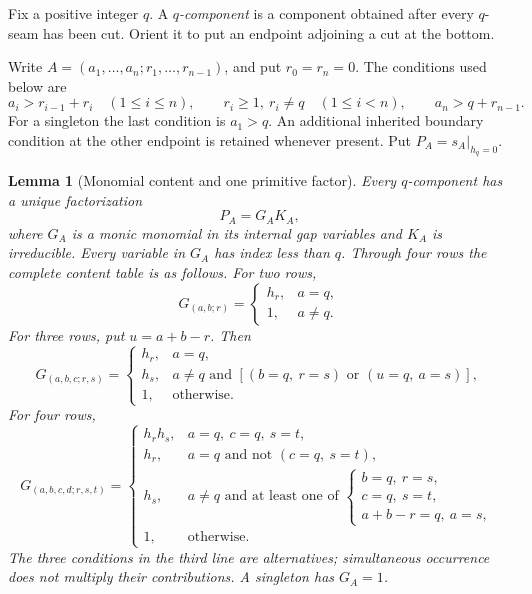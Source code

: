 \documentclass[11pt,a4paper]{amsart}
\numberwithin{equation}{section}
\theoremstyle{plain}
\newtheorem{lemma}[theorem]{Lemma}
\theoremstyle{definition}
\begin{document}
Fix a positive integer \(q\).  A \emph{\(q\)-component} is a
component obtained after every \(q\)-seam has been cut.  Orient it to
put an endpoint adjoining a cut at the bottom.

Write \(A=(a_1,\ldots,a_n;r_1,\ldots,r_{n-1})\), and put
\(r_0=r_n=0\).  The conditions used below are
\[
 a_i>r_{i-1}+r_i\quad(1\le i\le n),\qquad
 r_i\ge1,\ r_i\ne q\quad(1\le i<n),\qquad
 a_n>q+r_{n-1}.
\]
For a singleton the last condition is \(a_1>q\).  An additional
inherited boundary condition at the other endpoint is retained whenever
present.  Put \(P_A=s_A|_{h_q=0}\).

\begin{lemma}[Monomial content and one primitive factor]
\label{lem:staircase-content}
Every \(q\)-component has a unique factorization
\[
 P_A=G_AK_A,
\]
where \(G_A\) is a monic monomial in its internal gap variables and
\(K_A\) is irreducible.  Every variable in \(G_A\) has index less than
\(q\).  Through four rows the complete content table is as follows.
For two rows,
\[
 G_{(a,b;r)}=\begin{cases}h_r,&a=q,\\1,&a\ne q.\end{cases}
\]
For three rows, put \(u=a+b-r\).  Then
\[
 G_{(a,b,c;r,s)}=
 \begin{cases}
 h_r,&a=q,\\
 h_s,&a\ne q\text{ and }[(b=q,\ r=s)\text{ or }(u=q,\ a=s)],\\
 1,&\text{otherwise}.
 \end{cases}
\]
For four rows,
\[
 G_{(a,b,c,d;r,s,t)}=
 \begin{cases}
 h_rh_s,&a=q,\ c=q,\ s=t,\\
 h_r,&a=q\text{ and not }(c=q,\ s=t),\\
 h_s,&a\ne q\text{ and at least one of }\left\{
 \begin{array}{l}
 b=q,\ r=s,\\ c=q,\ s=t,\\ a+b-r=q,\ a=s,
 \end{array}\right.\\
 1,&\text{otherwise}.
 \end{cases}
\]
The three conditions in the third line are alternatives; simultaneous
occurrence does not multiply their contributions.  A singleton has
\(G_A=1\).
\end{lemma}
\end{document}

